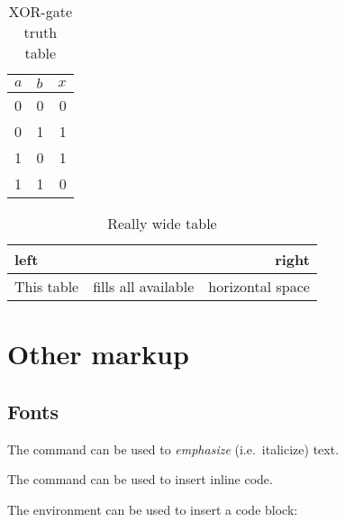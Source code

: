 \documentclass{projdoc}
\begin{document}
\begin{table}
	\centering
	\begin{tabular}{ll@{\qquad}r}
		\toprule
		$a$ & $b$ & $x$\\
		\midrule
		0 & 0 & 0\\
		0 & 1 & 1\\
		1 & 0 & 1\\
		1 & 1 & 0\\
		\bottomrule
	\end{tabular}
	\caption{XOR-gate truth table}
	\label{tab:gate-xor}
\end{table}

\begin{table}
	\begin{tabularx}{\linewidth}{lXr}
		\toprule
		left & & right\\
		\midrule
		This table & fills all available & horizontal space\\
		\bottomrule
	\end{tabularx}
	\caption{Really wide table}
\end{table}

\section{Other markup}

\subsection{Fonts}

The \codeinline{\emph} command can be used to \emph{emphasize} (i.e.~italicize) text.

The \codeinline{\codeinline} command can be used to insert inline code.

The  environment can be used to insert a code block:

\end{document}
